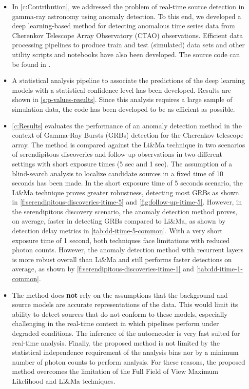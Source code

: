 \begin{itemize}

    \item In \autoref{c:Contribution}, we addressed the problem of real-time source detection in gamma-ray astronomy using anomaly detection. To this end, we developed a deep learning-based method for detecting anomalous time series data from Cherenkov Telescope Array Observatory (CTAO) observations. Efficient data processing pipelines to produce train and test (simulated) data sets and other utility scripts and notebooks have also been developed. The source code can be found in \cite{Baroncelli_2023}.

    \item A statistical analysis pipeline to associate the predictions of the deep learning models with a statistical confidence level has been developed. Results are shown in \autoref{s:p-values-results}. Since this analysis requires a large sample of simulation data, the code has been developed to be as efficient as possible.
        
    \item \autoref{c:Results} evaluates the performance of an anomaly detection method in the context of Gamma-Ray Bursts (GRBs) detection for the Cherenkov telescope array. The method is compared against the Li\&Ma technique in two scenarios of serendipitous discoveries and follow-up observations in two different settings with short exposure times (5 sec and 1 sec). The assumption of a blind-search analysis to localize candidate sources in a fixed time of 10 seconds has been made. In the short exposure time of 5 seconds scenario, the Li\&Ma technique proves greater robustness, detecting most GRBs as shown in \autoref{f:serendipitous-discoveries-itime-5} and \autoref{fig:follow-up-itime-5}. However, in the serendipitous discovery scenario, the anomaly detection method proves, on average, faster in detecting GRBs compared to Li\&Ma, as shown by detection delay metrics in \autoref{tab:dd-itime-5-common}. 
    With a very short exposure time of 1 second, both techniques face limitations with reduced photon counts. However, the anomaly detection method with recurrent layers is more robust overall than Li\&Ma and still performs faster detections on average, as shown by \autoref{f:serendipitous-discoveries-itime-1} and \autoref{tab:dd-itime-1-common}.

    \item The method does \textbf{not} rely on the assumptions that the background and source models are accurate representations of the data. This would limit its ability to detect sources that do not conform to these models, especially challenging in the real-time context in which pipelines perform under degraded conditions. The inference of the autoencoder is very fast suited for real-time analysis. Finally, the proposed method is not limited by the statistical independence requirement of the analysis bins nor by a minimum number of photon counts to perform analysis. For these reasons, the proposed method overcomes the limitation of the Full Field of View Maximum Likelihood and Li\&Ma techniques.
    

\end{itemize}
